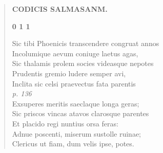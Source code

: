 \documentclass[11pt, a4paper]{report}
\begin{document}
\begin{verse}
    \begin{center} \textbf{CODICIS SALMASANM.} \end{center}\begin{center} \textbf{0 1 1} \end{center}Sic tibi Phoenicis transcendere congruat annos \\ Incolumique aevum coniuge laetus agas, \\ Sic thalamis prolem socies videasque nepotes \\ Prudentis gremio ludere semper avi, \\ Inclita sic celsi praevectus fata parentis \\ \textit{p. 136} \\ Exsuperes meritis saeclaque longa geras; \\ Sic priscos vincas atavos clarosque parentes \\ Et placido regi nuntius orsa feras: \\ Adnue poscenti, miserum sustolle ruinae; \\ Clericus ut fiam, dum velis ipse, potes. \\ 
      \end{verse}
  
\end{document}
